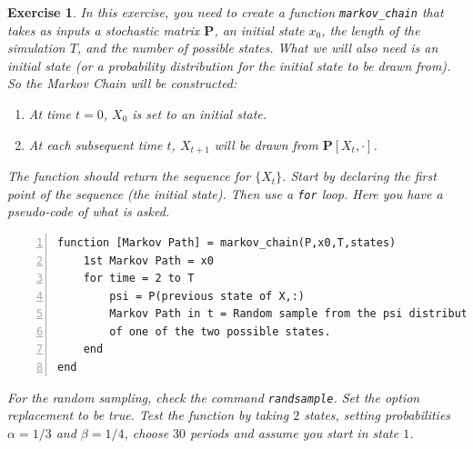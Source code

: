 \documentclass[a4paper,12pt]{article}
\newtheorem{exercise}{Exercise}
\begin{document}
\begin{exercise}
In this exercise, you need to create a function \texttt{markov_chain} that takes as inputs a stochastic matrix $\mathbf{P}$, an initial state $x_0$, the length of the simulation $T$, and the number of possible states. What we will also need is an initial state (or a probability distribution for the initial state to be drawn from). So the Markov Chain will be constructed:

\begin{enumerate}
	\item At time $t=0$, $X_0$ is set to an initial state.
	\item At each subsequent time $t$, $X_{t+1}$ will be drawn from $\mathbf{P}[X_t,\cdot]$.
\end{enumerate}
	
The function should return the sequence for $\{X_t\}$. Start by declaring the first point of the sequence (the initial state). Then use a \texttt{for} loop. Here you have a pseudo-code of what is asked. 

\begin{Verbatim}[numbers = left]
function [Markov Path] = markov_chain(P,x0,T,states)
	1st Markov Path = x0
	for time = 2 to T
		psi = P(previous state of X,:)
		Markov Path in t = Random sample from the psi distribution 
		of one of the two possible states.
	end
end
\end{Verbatim}

For the random sampling, check the command \texttt{randsample}. Set the option replacement to be true. Test the function by taking $2$ states, setting probabilities $\alpha = 1/3$ and $\beta = 1/4$, choose $30$ periods and assume you start in state $1$.
\end{exercise}
\end{document}
